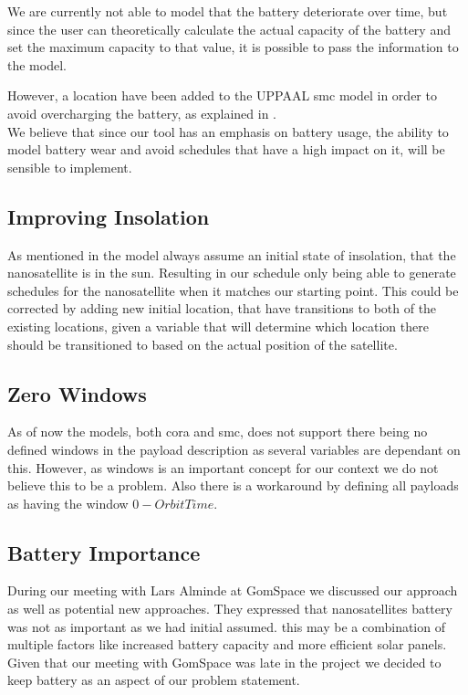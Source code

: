 We are currently not able to model that the battery deteriorate over time, but since the user can theoretically calculate the actual capacity of the battery and set the maximum capacity to that value, it is possible to pass the information to the model.

However, a location have been added to the UPPAAL \gls{smc} model in order to avoid overcharging the battery, as explained in .\\

We believe that since our tool has an emphasis on battery usage, the ability to model battery wear and avoid schedules that have a high impact on it, will be sensible to implement. 

\subsection*{Improving Insolation}
As mentioned in  the model always assume an initial state of insolation, that the nanosatellite is in the sun. Resulting in our schedule only being able to generate schedules for the nanosatellite when it matches our starting point.
This could be corrected by adding new initial location, that have transitions to both of the existing locations, given a variable that will determine which location there should be transitioned to based on the actual position of the satellite.


\subsection*{Zero Windows}
As of now the models, both \gls{cora} and \gls{smc}, does not support there being no defined windows in the payload description as several variables are dependant on this. However, as windows is an important concept for our context we do not believe this to be a problem. Also there is a workaround by defining all payloads as having the window $0-OrbitTime$.

\subsection*{Battery Importance}
During our meeting with Lars Alminde at GomSpace we discussed our approach as well as potential new approaches. They expressed that nanosatellites battery was not as important as we had initial assumed\cite{gom_space_conversation}. this may be a combination of multiple factors like increased battery capacity and more efficient solar panels. Given that our meeting with GomSpace was late in the project we decided to keep battery as an aspect of our problem statement.



